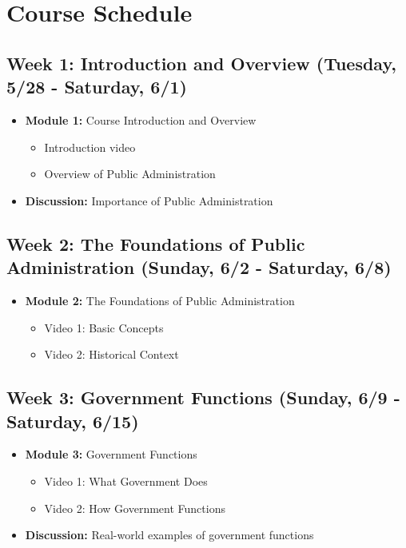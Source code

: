 \documentclass[11pt, letterpaper]{article}
\begin{document}
\section{Course Schedule}

\subsection*{Week 1: Introduction and Overview (Tuesday, 5/28 - Saturday, 6/1)}
\begin{itemize}
    \item \textbf{Module 1:} Course Introduction and Overview
    \begin{itemize}
        \item Introduction video
        \item Overview of Public Administration
    \end{itemize}
    \item \textbf{Discussion:} Importance of Public Administration
\end{itemize}

\subsection*{Week 2: The Foundations of Public Administration (Sunday, 6/2 - Saturday, 6/8)}
\begin{itemize}
    \item \textbf{Module 2:} The Foundations of Public Administration
    \begin{itemize}
        \item Video 1: Basic Concepts
        \item Video 2: Historical Context
    \end{itemize}
\end{itemize}

\subsection*{Week 3: Government Functions (Sunday, 6/9 - Saturday, 6/15)}
\begin{itemize}
    \item \textbf{Module 3:} Government Functions
    \begin{itemize}
        \item Video 1: What Government Does
        \item Video 2: How Government Functions
    \end{itemize}
    \item \textbf{Discussion:} Real-world examples of government functions
\end{itemize}
\end{document}
